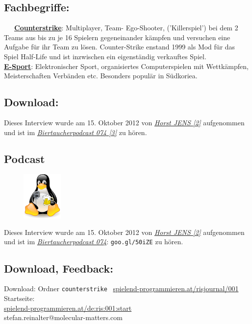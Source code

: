 \subsection*{Fachbegriffe:}

~~~\href{http://de.wikipedia.org/wiki/Counter-Strike}{\textbf{Counterstrike}}: Multiplayer, Team- Ego-Shooter, ('Killerspiel') bei dem 2 Teams aus bis zu je 16 Spielern gegeneinander kämpfen und versuchen eine Aufgabe für ihr Team zu lösen. Counter-Strike enstand 1999 als Mod für das Spiel Half-Life und ist inzwischen ein eigenständig verkauftes Spiel.  \\

\href{http://de.wikipedia.org/wiki/E-Sport}{\textbf{E-Sport}}: Elektronischer Sport, organisiertes Computerspielen mit Wettkämpfen, Meisterschaften Verbänden etc. Besonders populär in Südkoriea. \\

\subsection*{Download:}
Dieses Interview  wurde am 15. Oktober 2012 von \href{http://spielend-programmieren.at}{\textit{Horst JENS [2]}} aufgenommen und ist im \href{http://spielend-programmieren.at/de:podcast:biertaucher:2012:074}{\textit{Biertaucherpodcast 074 [3]}} zu hören.  

\subsection*{Podcast}
\begin{figure}
\includegraphics[width=2cm]{nomad/biertaucherlogo.png}
\end{figure}
Dieses Interview  wurde am 15. Oktober 2012 von \href{http://spielend-programmieren.at}{\textit{Horst JENS [2]}} aufgenommen und ist im \href{http://spielend-programmieren.at/de:podcast:biertaucher:2012:074}{\textit{Biertaucherpodcast 074}}: \texttt{goo.gl/50iZE} zu hören.

\subsection*{Download, Feedback:}
\footnotesize{
Download: Ordner \texttt{counterstrike} \Mundus\ \href{http://spielend-programmieren.at/risjournal/001}{spielend-programmieren.at/risjournal/001}\\
Startseite:\\
\href{http://spielend-programmieren.at/de:ris:001:start}{spielend-programmieren.at/de:ris:001:start}\\ 
\Letter\: stefan.reinalter@molecular-matters.com\\}
\normalsize 

